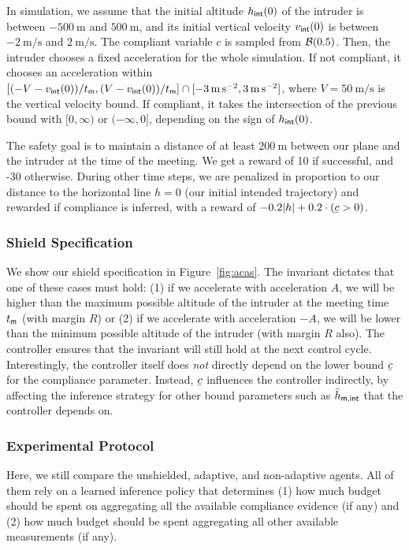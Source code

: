 In simulation, we assume that the initial altitude $h_\textsf{int}(0)$ of the intruder is between $\qty{-500}{\meter}$ and $\qty{500}{\meter}$, and its initial vertical velocity $v_\textsf{int}(0)$ is between $\qty{-2}{\meter\per\second}$ and $\qty{2}{\meter\per\second}$. The compliant variable $c$ is sampled from $\mathcal{B}(0.5)$. Then, the intruder chooses a fixed acceleration for the whole simulation. If not compliant, it chooses an acceleration within $[(-V - v_\textsf{int}(0)) / t_\textsf{m}, (V - v_\textsf{int}(0)) / t_\textsf{m}] \cap [\qty{-3}{\metre\per\second\squared}, \qty{3}{\metre\per\second\squared}]$, where $V=\qty{50}{\metre\per\second}$ is the vertical velocity bound. If compliant, it takes the intersection of the previous bound with $[0, \infty)$ or $(-\infty, 0]$, depending on the sign of $h_\textsf{int}(0)$.

The safety goal is to maintain a distance of at least $\qty{200}{\meter}$ between our plane and the intruder at the time of the meeting. We get a reward of 10 if successful, and -30 otherwise. During other time steps, we are penalized in proportion to our distance to the horizontal line $h=0$ (our initial intended trajectory) and rewarded if compliance is inferred, with a reward of $-0.2|h| + 0.2\cdot(\cacmin > 0)$.

\subsubsection{Shield Specification} We show our shield specification in Figure~\ref{fig:acas}.
The invariant dictates that one of these cases must hold: (1) if we accelerate with acceleration $A$, we will be higher than the maximum possible altitude of the intruder at the meeting time $t_\textsf{m}$ (with margin $R$) or (2) if we accelerate with acceleration $-A$, we will be lower than the minimum possible altitude of the intruder (with margin $R$ also). The controller ensures that the invariant will still hold at the next control cycle. Interestingly, the controller itself does \emph{not} directly depend on the lower bound $\cacmin$ for the compliance parameter. Instead, $\cacmin$ influences the controller indirectly, by affecting the inference strategy for other bound parameters such as ${\bar h}_\textsf{m,int}$ that the controller depends on.


\subsubsection{Experimental Protocol} Here, we still compare the unshielded, adaptive, and non-adaptive agents. All of them rely on a learned inference policy that determines (1) how much budget should be spent on aggregating all the available compliance evidence (if any) and (2) how much budget should be spent aggregating all other available measurements (if any).

